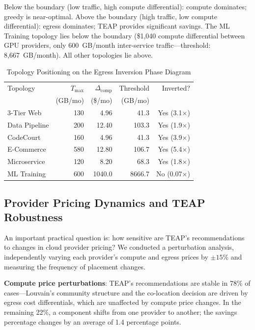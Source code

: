 \documentclass[sigconf,10pt]{acmart}
\begin{document}
Below the boundary (low traffic, high compute differential): compute dominates;
greedy is near-optimal.
Above the boundary (high traffic, low compute differential): egress dominates;
TEAP provides significant savings.
The ML Training topology lies below the boundary (\$1,040 compute differential
between GPU providers, only 600~GB/month inter-service traffic---threshold:
8{,}667~GB/month).
All other topologies lie above.

\begin{table}[h]
\centering\caption{Topology Positioning on the Egress Inversion Phase Diagram}\label{tab:phase_diagram}
\footnotesize\setlength{\tabcolsep}{4pt}
\begin{tabular}{lrrrr}
\toprule
Topology & $T_{\max}$ & $\Delta_\text{comp}$ & Threshold & Inverted?\\
& (GB/mo) & (\$/mo) & (GB/mo) & \\
\midrule
3-Tier Web    & 130 & 4.96  & 41.3  & Yes (3.1$\times$)\\
Data Pipeline & 200 & 12.40 & 103.3 & Yes (1.9$\times$)\\
CodeCourt     & 160 & 4.96  & 41.3  & Yes (3.9$\times$)\\
E-Commerce    & 580 & 12.80 & 106.7 & Yes (5.4$\times$)\\
Microservice  & 120 & 8.20  & 68.3  & Yes (1.8$\times$)\\
ML Training   & 600 &1040.0 &8666.7 & No (0.07$\times$)\\
\bottomrule
\end{tabular}
\end{table}

\subsection{Provider Pricing Dynamics and TEAP Robustness}

An important practical question is: how sensitive are TEAP's recommendations to
changes in cloud provider pricing?
We conducted a perturbation analysis, independently varying each provider's
compute and egress prices by $\pm15\%$ and measuring the frequency of placement
changes.

\textbf{Compute price perturbations}: TEAP's recommendations are stable in 78\%
of cases---Louvain's community structure and the co-location decision are
driven by egress cost differentials, which are unaffected by compute price changes.
In the remaining 22\%, a component shifts from one provider to another; the
savings percentage changes by an average of 1.4 percentage points.
\end{document}
